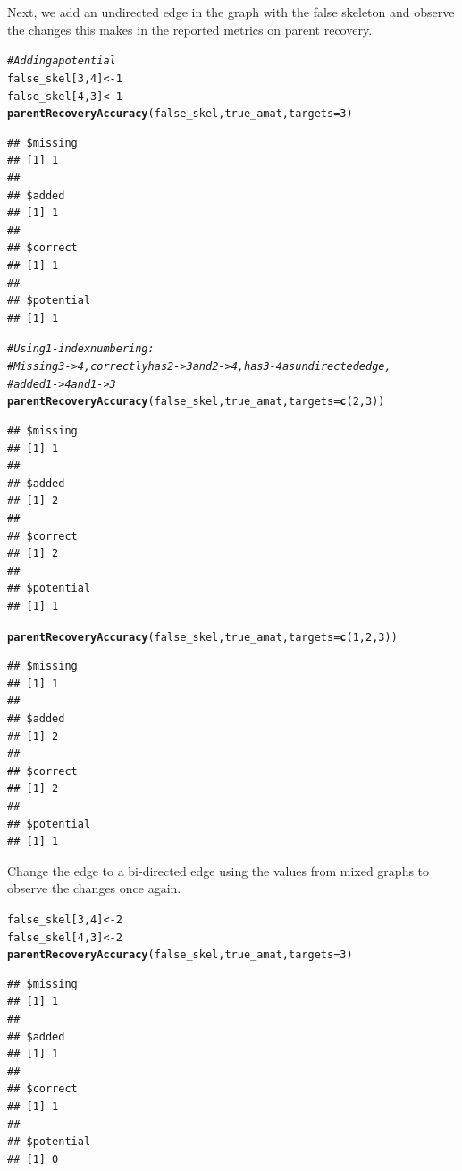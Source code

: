 \documentclass[12pt]{article}\usepackage[]{graphicx}\usepackage[]{color}
\makeatletter
\newcommand{\hlnum}[1]{\textcolor[rgb]{0.686,0.059,0.569}{#1}}%
\newcommand{\hlcom}[1]{\textcolor[rgb]{0.678,0.584,0.686}{\textit{#1}}}%
\newcommand{\hlstd}[1]{\textcolor[rgb]{0.345,0.345,0.345}{#1}}%
\newcommand{\hlkwb}[1]{\textcolor[rgb]{0.69,0.353,0.396}{#1}}%
\newcommand{\hlkwc}[1]{\textcolor[rgb]{0.333,0.667,0.333}{#1}}%
\newcommand{\hlkwd}[1]{\textcolor[rgb]{0.737,0.353,0.396}{\textbf{#1}}}%
\newenvironment{kframe}{%
 \def\at@end@of@kframe{}%
 \ifinner\ifhmode%
  \def\at@end@of@kframe{\end{minipage}}%
  \begin{minipage}{\columnwidth}%
 \fi\fi%
 \def\FrameCommand##1{\hskip\@totalleftmargin \hskip-\fboxsep
 \colorbox{shadecolor}{##1}\hskip-\fboxsep
     \hskip-\linewidth \hskip-\@totalleftmargin \hskip\columnwidth}%
 \MakeFramed {\advance\hsize-\width
   \@totalleftmargin\z@ \linewidth\hsize
   \@setminipage}}%
 {\par\unskip\endMakeFramed%
 \at@end@of@kframe}
\newenvironment{knitrout}{}{} %
\makeatother
\begin{document}
Next, we add an undirected edge in the graph with the false skeleton and observe the changes this makes in the reported metrics on parent recovery.
\begin{knitrout}
\color{fgcolor}\begin{kframe}
\begin{alltt}
\hlcom{# Adding a potential}
\hlstd{false_skel[}\hlnum{3}\hlstd{,}\hlnum{4}\hlstd{]} \hlkwb{<-} \hlnum{1}
\hlstd{false_skel[}\hlnum{4}\hlstd{,}\hlnum{3}\hlstd{]} \hlkwb{<-} \hlnum{1}
\hlkwd{parentRecoveryAccuracy}\hlstd{(false_skel,true_amat,}\hlkwc{targets} \hlstd{=} \hlnum{3}\hlstd{)}
\end{alltt}
\begin{verbatim}
## $missing
## [1] 1
## 
## $added
## [1] 1
## 
## $correct
## [1] 1
## 
## $potential
## [1] 1
\end{verbatim}
\begin{alltt}
\hlcom{# Using 1-index numbering: }
\hlcom{# Missing 3 -> 4, correctly has 2->3 and 2->4, has 3-4 as undirected edge, }
\hlcom{# added 1->4 and 1->3}
\hlkwd{parentRecoveryAccuracy}\hlstd{(false_skel,true_amat,}\hlkwc{targets} \hlstd{=} \hlkwd{c}\hlstd{(}\hlnum{2}\hlstd{,}\hlnum{3}\hlstd{))}
\end{alltt}
\begin{verbatim}
## $missing
## [1] 1
## 
## $added
## [1] 2
## 
## $correct
## [1] 2
## 
## $potential
## [1] 1
\end{verbatim}
\begin{alltt}
\hlkwd{parentRecoveryAccuracy}\hlstd{(false_skel,true_amat,}\hlkwc{targets} \hlstd{=} \hlkwd{c}\hlstd{(}\hlnum{1}\hlstd{,}\hlnum{2}\hlstd{,}\hlnum{3}\hlstd{))}
\end{alltt}
\begin{verbatim}
## $missing
## [1] 1
## 
## $added
## [1] 2
## 
## $correct
## [1] 2
## 
## $potential
## [1] 1
\end{verbatim}
\end{kframe}
\end{knitrout}

Change the edge to a bi-directed edge using the values from mixed graphs to observe the changes once again.
\begin{knitrout}
\color{fgcolor}\begin{kframe}
\begin{alltt}
\hlstd{false_skel[}\hlnum{3}\hlstd{,}\hlnum{4}\hlstd{]} \hlkwb{<-} \hlnum{2}
\hlstd{false_skel[}\hlnum{4}\hlstd{,}\hlnum{3}\hlstd{]} \hlkwb{<-} \hlnum{2}
\hlkwd{parentRecoveryAccuracy}\hlstd{(false_skel,true_amat,}\hlkwc{targets} \hlstd{=} \hlnum{3}\hlstd{)}
\end{alltt}
\begin{verbatim}
## $missing
## [1] 1
## 
## $added
## [1] 1
## 
## $correct
## [1] 1
## 
## $potential
## [1] 0
\end{verbatim}
\end{kframe}
\end{knitrout}
\end{document}
